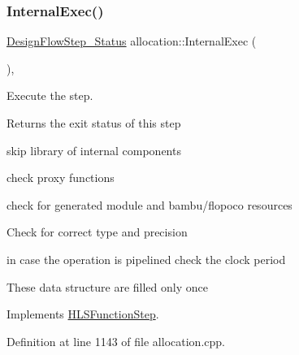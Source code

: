 \subsubsection{\texorpdfstring{Internal\+Exec()}{InternalExec()}}
{\footnotesize\ttfamily \hyperlink{design__flow__step_8hpp_afb1f0d73069c26076b8d31dbc8ebecdf}{Design\+Flow\+Step\+\_\+\+Status} allocation\+::\+Internal\+Exec (\begin{DoxyParamCaption}{ }\end{DoxyParamCaption})\hspace{0.3cm}{\ttfamily [override]}, {\ttfamily [virtual]}}



Execute the step. 

\begin{DoxyReturn}{Returns}
the exit status of this step 
\end{DoxyReturn}
skip library of internal components

check proxy functions

check for generated module and bambu/flopoco resources

Check for correct type and precision

in case the operation is pipelined check the clock period

These data structure are filled only once 

Implements \hyperlink{classHLSFunctionStep_a8db4c00d080655984d98143206fc9fa8}{H\+L\+S\+Function\+Step}.



Definition at line 1143 of file allocation.\+cpp.



